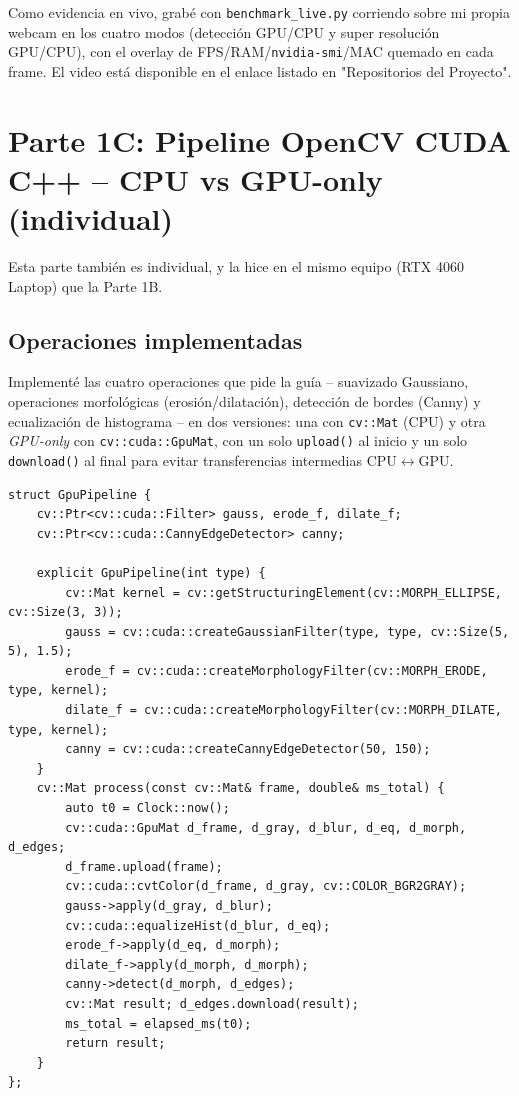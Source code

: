 \documentclass[12pt,a4paper]{article}
\let\oldsubsection\subsection
\renewcommand{\subsection}[1]{\needspace{5\baselineskip}\oldsubsection{#1}}
\begin{document}
Como evidencia en vivo, grabé con \texttt{benchmark\_live.py} corriendo sobre mi propia webcam en los cuatro modos (detección GPU/CPU y super resolución GPU/CPU), con el overlay de FPS/RAM/\texttt{nvidia-smi}/MAC quemado en cada frame. El video está disponible en el enlace listado en "Repositorios del Proyecto".

\section{Parte 1C: Pipeline OpenCV CUDA C++ -- CPU vs GPU-only (individual)}

Esta parte también es individual, y la hice en el mismo equipo (RTX 4060 Laptop) que la Parte 1B.

\subsection{Operaciones implementadas}

Implementé las cuatro operaciones que pide la guía -- suavizado Gaussiano, operaciones morfológicas (erosión/dilatación), detección de bordes (Canny) y ecualización de histograma -- en dos versiones: una con \texttt{cv::Mat} (CPU) y otra \emph{GPU-only} con \texttt{cv::cuda::GpuMat}, con un solo \texttt{upload()} al inicio y un solo \texttt{download()} al final para evitar transferencias intermedias CPU$\leftrightarrow$GPU.

\clearpage
\begin{lstlisting}
struct GpuPipeline {
    cv::Ptr<cv::cuda::Filter> gauss, erode_f, dilate_f;
    cv::Ptr<cv::cuda::CannyEdgeDetector> canny;

    explicit GpuPipeline(int type) {
        cv::Mat kernel = cv::getStructuringElement(cv::MORPH_ELLIPSE, cv::Size(3, 3));
        gauss = cv::cuda::createGaussianFilter(type, type, cv::Size(5, 5), 1.5);
        erode_f = cv::cuda::createMorphologyFilter(cv::MORPH_ERODE, type, kernel);
        dilate_f = cv::cuda::createMorphologyFilter(cv::MORPH_DILATE, type, kernel);
        canny = cv::cuda::createCannyEdgeDetector(50, 150);
    }
    cv::Mat process(const cv::Mat& frame, double& ms_total) {
        auto t0 = Clock::now();
        cv::cuda::GpuMat d_frame, d_gray, d_blur, d_eq, d_morph, d_edges;
        d_frame.upload(frame);
        cv::cuda::cvtColor(d_frame, d_gray, cv::COLOR_BGR2GRAY);
        gauss->apply(d_gray, d_blur);
        cv::cuda::equalizeHist(d_blur, d_eq);
        erode_f->apply(d_eq, d_morph);
        dilate_f->apply(d_morph, d_morph);
        canny->detect(d_morph, d_edges);
        cv::Mat result; d_edges.download(result);
        ms_total = elapsed_ms(t0);
        return result;
    }
};
\end{lstlisting}
\end{document}
